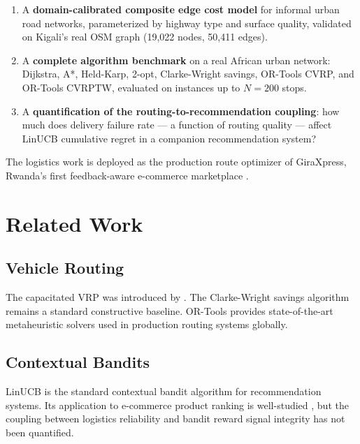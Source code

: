 \documentclass[12pt, a4paper]{article}
\begin{document}
\begin{enumerate}
  \item A \textbf{domain-calibrated composite edge cost model} for informal
        urban road networks, parameterized by highway type and surface quality,
        validated on Kigali's real OSM graph (19,022 nodes, 50,411 edges).

  \item A \textbf{complete algorithm benchmark} on a real African urban
        network: Dijkstra, A*, Held-Karp, 2-opt, Clarke-Wright savings,
        OR-Tools CVRP, and OR-Tools CVRPTW, evaluated on instances up to
        $N=200$ stops.

  \item A \textbf{quantification of the routing-to-recommendation coupling}:
        how much does delivery failure rate --- a function of routing quality ---
        affect LinUCB cumulative regret in a companion recommendation system?
\end{enumerate}

The logistics work is deployed as the production route optimizer of GiraXpress,
Rwanda's first feedback-aware e-commerce marketplace \cite{giraxpress2026}.

\section{Related Work}
\label{sec:related}

\subsection{Vehicle Routing}
The capacitated VRP was introduced by \citet{dantzigRamser1959}. The
Clarke-Wright savings algorithm \cite{clarkeWright1964} remains a standard
constructive baseline. OR-Tools \cite{ortools} provides state-of-the-art
metaheuristic solvers used in production routing systems globally.

\subsection{Contextual Bandits}
LinUCB \cite{li2010contextual} is the standard contextual bandit algorithm for
recommendation systems. Its application to e-commerce product ranking is
well-studied \cite{li2016collaborative}, but the coupling between logistics
reliability and bandit reward signal integrity has not been quantified.
\end{document}
